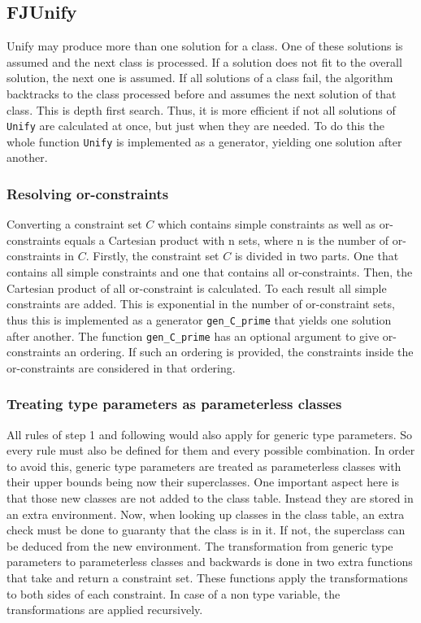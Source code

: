 \subsection{FJUnify}

Unify may produce more than one solution for a class. One of these solutions is assumed and the next class is processed. If a solution does not fit to the overall solution, the next one is assumed.
If all solutions of a class fail, the algorithm backtracks to the class processed before and assumes the next solution of that class. This is depth first search. Thus, it is more efficient if not all solutions of \verb|Unify| are calculated at once, but just when they are needed.
To do this the whole function \verb|Unify| is implemented as a generator, yielding one solution after another.

\subsubsection{Resolving or-constraints}
Converting a constraint set $C$ which contains simple constraints as well as or-constraints equals a Cartesian product with n sets, where n is the number of or-constraints in $C$.
Firstly, the constraint set $C$ is divided in two parts. One that contains all simple constraints and one that contains all or-constraints.
Then, the Cartesian product of all or-constraint is calculated. To each result all simple constraints are added. This is exponential in the number of or-constraint sets, thus this is implemented as a generator \verb|gen_C_prime| that yields one solution after another.
The function \verb|gen_C_prime| has an optional argument to give or-constraints an ordering. If such an ordering is provided, the constraints inside the or-constraints are considered in that ordering.

\subsubsection{Treating type parameters as parameterless classes}
All rules of step 1 and following would also apply for generic type parameters. So every rule must also be defined for them and every possible combination. In order to avoid this, generic type parameters are treated as parameterless classes with their upper bounds being now their superclasses. One important aspect here is that those new classes are not added to the class table. Instead they are stored in an extra environment. Now, when looking up classes in the class table, an extra check must be done to guaranty that the class is in it. If not, the superclass can be deduced from the new environment.
The transformation from  generic type parameters to parameterless classes and backwards is done in two extra functions that take and return a constraint set.
These functions apply the transformations to both sides of each constraint. In case of a non type variable, the transformations are applied recursively.


